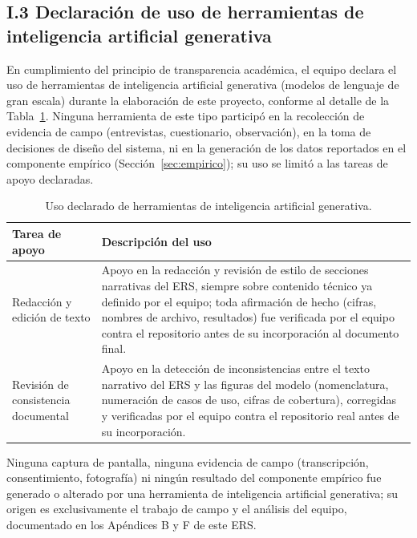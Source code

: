 \documentclass[journal,onecolumn]{IEEEtran}
\begin{document}
\subsection*{I.3 Declaración de uso de herramientas de inteligencia artificial generativa}
\label{sec:declaracion-ia-generativa}

En cumplimiento del principio de transparencia académica, el equipo
declara el uso de herramientas de inteligencia artificial generativa
(modelos de lenguaje de gran escala) durante la elaboración de este
proyecto, conforme al detalle de la Tabla~\ref{tab:uso-ia-generativa}.
Ninguna herramienta de este tipo participó en la recolección de evidencia
de campo (entrevistas, cuestionario, observación), en la toma de
decisiones de diseño del sistema, ni en la generación de los datos
reportados en el componente empírico (Sección~\ref{sec:empirico}); su uso
se limitó a las tareas de apoyo declaradas.

\begin{table}[H]
	\centering
	\small
	\caption{Uso declarado de herramientas de inteligencia artificial generativa.}
	\label{tab:uso-ia-generativa}
	\begin{tabularx}{\textwidth}{@{}p{3.0cm} X@{}}
		\toprule
		\textbf{Tarea de apoyo} & \textbf{Descripción del uso} \\
		\midrule
		Redacción y edición de texto & Apoyo en la redacción y revisión de estilo de secciones narrativas del ERS, siempre sobre contenido técnico ya definido por el equipo; toda afirmación de hecho (cifras, nombres de archivo, resultados) fue verificada por el equipo contra el repositorio antes de su incorporación al documento final. \\

		\addlinespace
		Revisión de consistencia documental & Apoyo en la detección de inconsistencias entre el texto narrativo del ERS y las figuras del modelo (nomenclatura, numeración de casos de uso, cifras de cobertura), corregidas y verificadas por el equipo contra el repositorio real antes de su incorporación. \\
		\bottomrule
	\end{tabularx}
\end{table}

Ninguna captura de pantalla, ninguna evidencia de campo (transcripción,
consentimiento, fotografía) ni ningún resultado del componente empírico
fue generado o alterado por una herramienta de inteligencia artificial
generativa; su origen es exclusivamente el trabajo de campo y el análisis
del equipo, documentado en los Apéndices B y F de este ERS.
\end{document}
